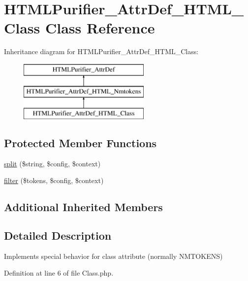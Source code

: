 \hypertarget{classHTMLPurifier__AttrDef__HTML__Class}{\section{H\+T\+M\+L\+Purifier\+\_\+\+Attr\+Def\+\_\+\+H\+T\+M\+L\+\_\+\+Class Class Reference}
\label{classHTMLPurifier__AttrDef__HTML__Class}
}
Inheritance diagram for H\+T\+M\+L\+Purifier\+\_\+\+Attr\+Def\+\_\+\+H\+T\+M\+L\+\_\+\+Class\+:\begin{figure}[H]
\begin{center}
\leavevmode
\includegraphics[height=3.000000cm]{classHTMLPurifier__AttrDef__HTML__Class}
\end{center}
\end{figure}
\subsection*{Protected Member Functions}
\begin{DoxyCompactItemize}
\item 
\hyperlink{classHTMLPurifier__AttrDef__HTML__Class_acbe33b2810bfa2c889e697556934e744}{split} (\$string, \$config, \$context)
\item 
\hyperlink{classHTMLPurifier__AttrDef__HTML__Class_a8ae03e46ebda66c51de960a1c23f7417}{filter} (\$tokens, \$config, \$context)
\end{DoxyCompactItemize}
\subsection*{Additional Inherited Members}


\subsection{Detailed Description}
Implements special behavior for class attribute (normally N\+M\+T\+O\+K\+E\+N\+S) 

Definition at line 6 of file Class.\+php.



